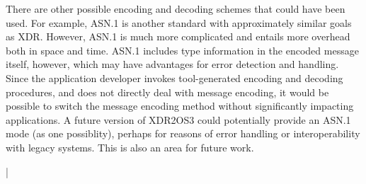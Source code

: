 There are other possible encoding and decoding schemes that could have been used. For example,
ASN.1 \cite{asn.1} is another standard with approximately similar goals as XDR. However, ASN.1
is much more complicated and entails more overhead both in space and time. ASN.1 includes type
information in the encoded message itself, however, which may have advantages for error
detection and handling. Since the application developer invokes tool-generated encoding and
decoding procedures, and does not directly deal with message encoding, it would be possible to
switch the message encoding method without significantly impacting applications. A future
version of XDR2OS3 could potentially provide an ASN.1 mode (as one possiblity), perhaps for
reasons of error handling or interoperability with legacy systems. This is also an area for
future work.

\lstDeleteShortInline|
